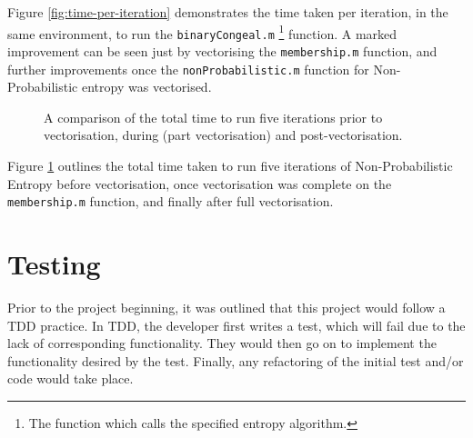 Figure \ref{fig:time-per-iteration} demonstrates the time taken per iteration, in the same environment, to run the \texttt{binaryCongeal.m} \footnote{The function which calls the specified entropy algorithm.} function. A marked improvement can be seen just by vectorising the \texttt{membership.m} function, and further improvements once the \texttt{nonProbabilistic.m} function for Non-Probabilistic entropy was vectorised.

\begin{figure}[H]
  \begin{center}
    \caption{A comparison of the total time to run five iterations prior to vectorisation, during (part vectorisation) and post-vectorisation.}
    \label{fig:total-time}
  \end{center}
\end{figure}

Figure \ref{fig:total-time} outlines the total time taken to run five iterations of Non-Probabilistic Entropy before vectorisation, once vectorisation was complete on the \texttt{membership.m} function, and finally after full vectorisation.

\newpage
\section{Testing}

Prior to the project beginning, it was outlined that this project would follow a \acrfull{TDD} practice. In \acrshort{TDD}, the developer first writes a test, which will fail due to the lack of corresponding functionality. They would then go on to implement the functionality desired by the test. Finally, any refactoring of the initial test and/or code would take place.

